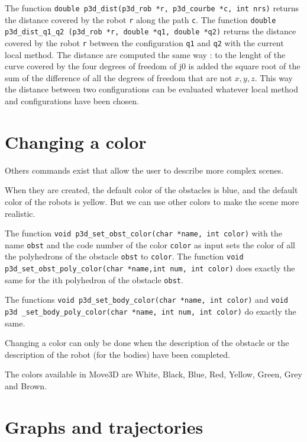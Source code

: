 The function {\tt double p3d\_dist(p3d\_rob *r, p3d\_courbe *c, int
nrs)}  returns the distance covered by the robot {\tt r} along the path
{\tt c}. The function {\tt double p3d\_dist\_q1\_q2 (p3d\_rob *r,
double *q1, double *q2)}  returns the distance covered by the robot
{\tt r} between the configuration {\tt q1} and {\tt q2} with the
current local method. The distance are computed the same way : to the
lenght of the curve covered by the four degrees of freedom of j0 is
added the square root of the sum of the difference of all the degrees
of freedom that are not $x,y,z$. This way the distance between two
configurations can be evaluated whatever local method and
configurations have been chosen.

\section{Changing a color}

Others commands exist that allow the user to describe more complex
scenes.

When they are created, the default color of the obstacles is blue,
and the default color of the robots is yellow. But we can use other
colors to make the scene more realistic.

The function {\tt void p3d\_set\_obst\_color(char *name, int color)}
 with the name {\tt obst} and the code
number of the color {\tt color} as input sets the color of all the
polyhedrons of the obstacle {\tt obst} to {\tt color}. The function
{\tt void p3d\_set\_obst\_poly\_color(char *name,int num, int color)}
 does exactly the same for the ith
polyhedron of the obstacle {\tt obst}.

The functions {\tt void p3d\_set\_body\_color(char *name, int color)}
 and {\tt void
p3d \_set\_body\_poly\_color(char *name, int num, int color)}
 do exactly the same.

Changing a color can only be done when the description of the obstacle 
or the description of the robot (for the bodies) have been completed.

The colors available in Move3D are White, Black, Blue, Red, Yellow,
Green, Grey and Brown.

\section{Graphs and trajectories}

